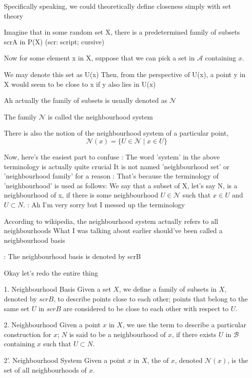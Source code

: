 Specifically speaking, we could theoretically define closeness simply with set theory

Imagine that in some random set X, there is a predetermined family of subsets scrA in P(X)
(scr: script; cursive)

Now for some element x in X, suppose that we can pick a set in $\mathscr{A}$ containing $x$. 

We may denote this set as U(x)
Then, from the perspective of U(x), a point y in X would seem to be close to x if y also lies in U(x)

Ah actually the family of subsets is usually denoted as $\mathscr{N}$

The family $\mathscr{N}$ is called the neighbourhood system

There is also the notion of the neighbourhood system of a particular point,
\[ \mathscr N(x) = \{U \in \mathscr{N} \mid x \in U\} \]

Now, here's the easiest part to confuse
:
The word 'system' in the above terminology is actually quite crucial
It is not named 'neighbourhood set' or 'neighbourhood family' for a reason
:
That's because the terminology of 'neighbourhood' is used as follows:
We say that a subset of X, let's say N, is a neighbourhood of x, if there is some neighbourhood $U \in \mathscr{N}$ such that $x \in U$ and $U \subset N$.
:
Ah I'm very sorry but I messed up the terminology

According to wikipedia, the neighbourhood system actually refers to all neighbourhoods
What I was talking about earlier should've been called a neighbourhood basis

:
The neighbourhood basis is denoted by scrB



Okay let's redo the entire thing

1. Neighbourhood Basis
Given a set $X$, we define a family of subsets in $X$, denoted by $scrB$, to describe points close to each other; points that belong to the same set $U$ in $scrB$ are considered to be close to each other with respect to $U$.

2. Neighbourhood
Given a point $x$ in $X$, we use the term  to describe a particular construction for $x$; $N$ is said to be a neighbourhood of $x$, if there exists $U$ in $\mathscr{B}$ containing $x$ such that $U \subset N$.

2'. Neighbourhood System
Given a point $x$ in $X$, the  of $x$, denoted $\mathscr{N}(x)$, is the set of all neighbourhoods of $x$.

